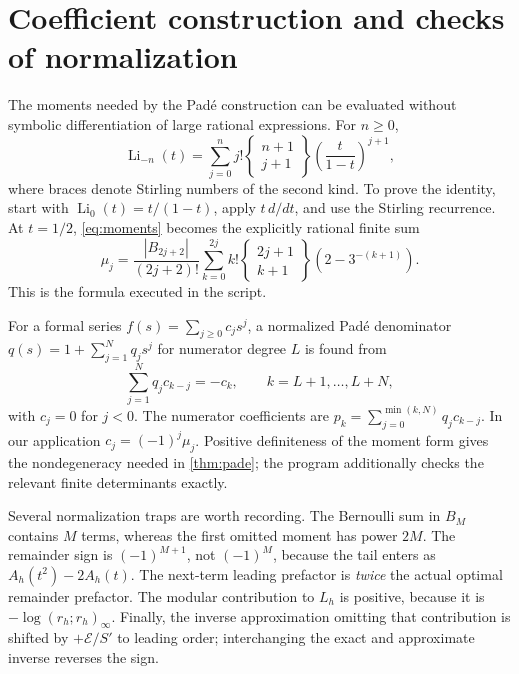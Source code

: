 \documentclass[11pt,a4paper]{article}
\newcommand{\Li}{\operatorname{Li}}
\newcommand{\E}{\mathcal E}
\newcommand{\qpoch}[2]{(#1;#2)_\infty}
\numberwithin{equation}{section}
\theoremstyle{plain}
\theoremstyle{definition}
\theoremstyle{remark}
\begin{document}
\section{Coefficient construction and checks of normalization}
\label{app:coefficients}

The moments needed by the Pad\'e construction can be evaluated without
symbolic differentiation of large rational expressions. For $n\ge0$,
\begin{equation}
 \Li_{-n}(t)=\sum_{j=0}^{n}j!\left\{\begin{matrix}n+1\\j+1\end{matrix}\right\}
                         \left(\frac t{1-t}\right)^{j+1},
 \label{eq:stirlingpolylog}
\end{equation}
where braces denote Stirling numbers of the second kind. To prove the
identity, start with $\Li_0(t)=t/(1-t)$, apply $t\,d/dt$, and use the Stirling
recurrence. At $t=1/2$, \eqref{eq:moments} becomes the explicitly rational
finite sum
\begin{equation}
 \mu_j=\frac{|B_{2j+2}|}{(2j+2)!}
 \sum_{k=0}^{2j}k!\left\{\begin{matrix}2j+1\\k+1\end{matrix}\right\}
                    \left(2-3^{-(k+1)}\right).
 \label{eq:rationalmoments}
\end{equation}
This is the formula executed in the script.

For a formal series $f(s)=\sum_{j\ge0}c_js^j$, a normalized Pad\'e denominator
$q(s)=1+\sum_{j=1}^Nq_js^j$ for numerator degree $L$ is found from
\begin{equation}
 \sum_{j=1}^{N}q_jc_{k-j}=-c_k,\qquad k=L+1,\ldots,L+N,
 \label{eq:padelinear}
\end{equation}
with $c_j=0$ for $j<0$. The numerator coefficients are
$p_k=\sum_{j=0}^{\min(k,N)}q_jc_{k-j}$. In our application
$c_j=(-1)^j\mu_j$. Positive definiteness of the moment form gives the
nondegeneracy needed in \cref{thm:pade}; the program additionally checks the
relevant finite determinants exactly.

Several normalization traps are worth recording. The Bernoulli sum in
$B_M$ contains $M$ terms, whereas the first omitted moment has power $2M$.
The remainder sign is $(-1)^{M+1}$, not $(-1)^M$, because the tail enters as
$A_h(t^2)-2A_h(t)$. The next-term leading prefactor is \emph{twice} the
actual optimal remainder prefactor. The modular contribution to $L_h$ is
positive, because it is $-\log\qpoch{r_h}{r_h}$. Finally, the inverse
approximation omitting that contribution is shifted by $+\E/S'$ to leading
order; interchanging the exact and approximate inverse reverses the sign.
\end{document}
